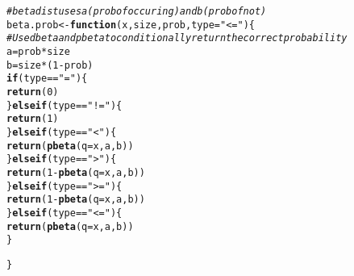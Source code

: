\documentclass{article}\usepackage[]{graphicx}\usepackage[]{xcolor}
\makeatletter
\newcommand{\hlnum}[1]{\textcolor[rgb]{0.686,0.059,0.569}{#1}}%
\newcommand{\hlsng}[1]{\textcolor[rgb]{0.192,0.494,0.8}{#1}}%
\newcommand{\hlcom}[1]{\textcolor[rgb]{0.678,0.584,0.686}{\textit{#1}}}%
\newcommand{\hlopt}[1]{\textcolor[rgb]{0,0,0}{#1}}%
\newcommand{\hldef}[1]{\textcolor[rgb]{0.345,0.345,0.345}{#1}}%
\newcommand{\hlkwa}[1]{\textcolor[rgb]{0.161,0.373,0.58}{\textbf{#1}}}%
\newcommand{\hlkwb}[1]{\textcolor[rgb]{0.69,0.353,0.396}{#1}}%
\newcommand{\hlkwc}[1]{\textcolor[rgb]{0.333,0.667,0.333}{#1}}%
\newcommand{\hlkwd}[1]{\textcolor[rgb]{0.737,0.353,0.396}{\textbf{#1}}}%
\newenvironment{kframe}{%
 \def\at@end@of@kframe{}%
 \ifinner\ifhmode%
  \def\at@end@of@kframe{\end{minipage}}%
  \begin{minipage}{\columnwidth}%
 \fi\fi%
 \def\FrameCommand##1{\hskip\@totalleftmargin \hskip-\fboxsep
 \colorbox{shadecolor}{##1}\hskip-\fboxsep
     \hskip-\linewidth \hskip-\@totalleftmargin \hskip\columnwidth}%
 \MakeFramed {\advance\hsize-\width
   \@totalleftmargin\z@ \linewidth\hsize
   \@setminipage}}%
 {\par\unskip\endMakeFramed%
 \at@end@of@kframe}
\newenvironment{knitrout}{}{} %
\makeatother
\begin{document}
\begin{enumerate}
\begin{knitrout}\scriptsize
{}\color{fgcolor}\begin{kframe}
\begin{alltt}
\hlcom{# beta dist uses a(prob of occuring) and b(prob of not)}
\hldef{beta.prob} \hlkwb{<-} \hlkwa{function}\hldef{(}\hlkwc{x}\hldef{,} \hlkwc{size}\hldef{,} \hlkwc{prob}\hldef{,} \hlkwc{type}\hldef{=}\hlsng{"<="}\hldef{)\{}
  \hlcom{# Use dbeta and pbeta to conditionally return the correct probability}
  \hldef{a} \hlkwb{=} \hldef{prob}\hlopt{*} \hldef{size}
  \hldef{b} \hlkwb{=} \hldef{size} \hlopt{*}\hldef{(}\hlnum{1}\hlopt{-}\hldef{prob)}
  \hlkwa{if}\hldef{(type} \hlopt{==} \hlsng{"="}\hldef{)\{}
    \hlkwd{return}\hldef{(}\hlnum{0}\hldef{)}
  \hldef{\}}\hlkwa{else if}\hldef{(type} \hlopt{==} \hlsng{"!="}\hldef{)\{}
    \hlkwd{return}\hldef{(}\hlnum{1}\hldef{)}
  \hldef{\}}\hlkwa{else if}\hldef{(type} \hlopt{==} \hlsng{"<"}\hldef{)\{}
    \hlkwd{return}\hldef{(}\hlkwd{pbeta}\hldef{(}\hlkwc{q} \hldef{= x, a, b))}
  \hldef{\}}\hlkwa{else if}\hldef{(type} \hlopt{==} \hlsng{">"}\hldef{)\{}
    \hlkwd{return}\hldef{(}\hlnum{1} \hlopt{-} \hlkwd{pbeta}\hldef{(}\hlkwc{q} \hldef{= x, a, b))}
  \hldef{\}}\hlkwa{else if}\hldef{(type} \hlopt{==} \hlsng{">="}\hldef{)\{}
    \hlkwd{return}\hldef{(}\hlnum{1} \hlopt{-} \hlkwd{pbeta}\hldef{(}\hlkwc{q} \hldef{= x, a, b))}
  \hldef{\}}\hlkwa{else if}\hldef{(type} \hlopt{==} \hlsng{"<="}\hldef{)\{}
    \hlkwd{return}\hldef{(}\hlkwd{pbeta}\hldef{(}\hlkwc{q} \hldef{= x, a, b))}
  \hldef{\}}

\hldef{\}}


\end{alltt}
\end{kframe}
\end{knitrout}
\end{enumerate}
\end{document}
